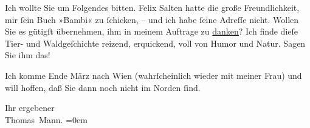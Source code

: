 \pstart
           Ich wollte Sie um Folgendes bitten. Felix
                  Salten hatte die große Freundlichkeit, mir ſein Buch »Bambi« zu ſchicken, – und ich habe ſeine Adreſſe nicht. Wollen
               Sie es gütigſt übernehmen, ihm in meinem Auftrage zu \uline{danken}? Ich finde dieſe Tier- und Waldgeſchichte reizend, erquickend, voll
               von Humor und Natur. Sagen Sie ihm das!\pend
           
\pstart
           Ich komme Ende März nach Wien (wahrſcheinlich
               wieder mit meiner Frau) und
               will hoffen, daß Sie dann noch nicht im Norden ſind.\pend
           
\pstart
           Ihr ergebener{\\[\baselineskip]}\spacefill\mbox{Thomas Mann.}\pend
           \leftskip=0em{}\endnumbering{}  
      